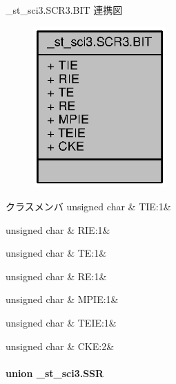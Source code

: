 \+\_\+st\+\_\+sci3.\+S\+C\+R3.\+B\+I\+T 連携図
\nopagebreak
\begin{figure}[H]
\begin{center}
\leavevmode
\includegraphics[width=145pt]{db/d6d/struct__st__sci3_8SCR3_8BIT__coll__graph}
\end{center}
\end{figure}
\begin{DoxyFields}{クラスメンバ}
unsigned char\label{3694s_8h_a8eb6c56ba51924a4cf185ec29e22be22}
&
T\+I\+E\+:1&
\\
\hline

unsigned char\label{3694s_8h_a73cf42509991cff6949aa0431ce86b00}
&
R\+I\+E\+:1&
\\
\hline

unsigned char\label{3694s_8h_a83f56f37a245ccaf8c885814074777f6}
&
T\+E\+:1&
\\
\hline

unsigned char\label{3694s_8h_aadf72a0db2cbd36462d3aa203eda902f}
&
R\+E\+:1&
\\
\hline

unsigned char\label{3694s_8h_a8154f016c92eed6f02d242ccc6a2e27e}
&
M\+P\+I\+E\+:1&
\\
\hline

unsigned char\label{3694s_8h_ab89346c173959f39be466817e44ef2b6}
&
T\+E\+I\+E\+:1&
\\
\hline

unsigned char\label{3694s_8h_a0a246429d37279d3ac5055c7b8da6564}
&
C\+K\+E\+:2&
\\
\hline

\end{DoxyFields}
\label{union__st__sci3_8SSR}
\paragraph{union \+\_\+st\+\_\+sci3.\+S\+S\+R}



